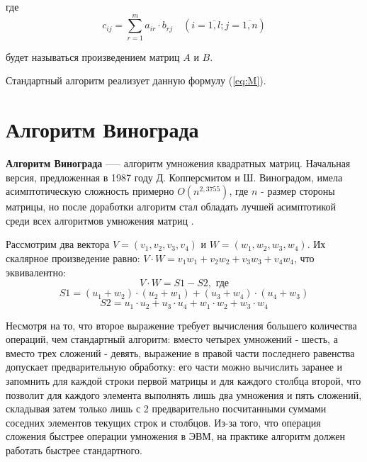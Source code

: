 где
\begin{equation}
	\label{eq:M}
	c_{ij} =
	\sum_{r=1}^{m} a_{ir} \cdot b_{rj} \quad (i=\overline{1,l}; j=\overline{1,n})
\end{equation}

будет называться произведением матриц $A$ и $B$.

Стандартный алгоритм реализует данную формулу (\ref{eq:M}).

\section{Алгоритм Винограда}

\textbf{Алгоритм Винограда} \cite{vinogr} --— алгоритм умножения квадратных матриц. Начальная версия, предложенная в 1987 году Д. Копперсмитом и Ш. Виноградом, имела асимптотическую сложность примерно $O(n^{2,3755})$, где $n$ - размер стороны матрицы, но после доработки алгоритм стал обладать лучшей асимптотикой среди всех алгоритмов умножения матриц \cite{Cohn}.

\bigskip

Рассмотрим два вектора $V = (v_1, v_2, v_3, v_4)$ и $W = (w_1, w_2, w_3, w_4)$.
Их скалярное произведение равно: $V \cdot W = v_1w_1 + v_2w_2 + v_3w_3 + v_4w_4$, что эквивалентно:
\begin{equation}
	V \cdot W = S1 - S2, \text{ где}
\end{equation}
\begin{equation*}
	S1 = (u_1 + w_2) \cdot (u_2 + w_1) + (u_3 + w_4) \cdot (u_4 + w_3)
\end{equation*}
\begin{equation*}
	S2 = u_1 \cdot u_2 + u_3 \cdot u_4 + w_1 \cdot w_2 + w_3 \cdot w_4
\end{equation*}

Несмотря на то, что второе выражение требует вычисления большего количества операций, чем стандартный алгоритм: вместо четырех умножений - шесть, а вместо трех сложений - девять, выражение в правой части последнего равенства допускает предварительную обработку: его части можно вычислить заранее и запомнить для каждой строки первой матрицы и для каждого столбца второй, что позволит для каждого элемента выполнять лишь два умножения и пять сложений, складывая затем только лишь с 2 предварительно посчитанными суммами соседних элементов текущих строк и столбцов.
Из-за того, что операция сложения быстрее операции умножения в ЭВМ, на практике алгоритм должен работать быстрее стандартного.

